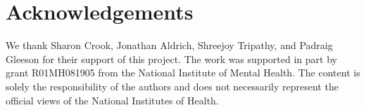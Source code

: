 \documentclass{frontiersSCNS}
\begin{document}
\section*{Acknowledgements}
We thank Sharon Crook, Jonathan Aldrich, Shreejoy Tripathy, and Padraig Gleeson for their support of this project.  
The work was supported in part by grant R01MH081905 from the National Institute of Mental Health. 
The content is solely the responsibility of the authors and does not necessarily represent the official views of the National Institutes of Health.



%
%
\end{document}
